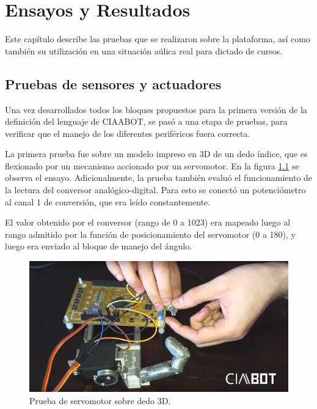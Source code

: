 
\chapter{Ensayos y Resultados} %

\label{Chapter4} %


Este capítulo describe las pruebas que se realizaron sobre la plataforma, así como también su utilización en una situación aúlica real para dictado de cursos.

\section{Pruebas de sensores y actuadores}
\label{sec:pruebas}
Una vez desarrollados todos los bloques propuestos para la primera versión de la definición del lenguaje de CIAABOT, se pasó a una etapa de pruebas, para verificar que el manejo de los diferentes periféricos fuera correcta.

La primera prueba fue sobre un modelo impreso en 3D de un dedo índice, que es flexionado por un mecanismo accionado por un servomotor. En la figura \ref{fig:dedoServo} se observa el ensayo. Adicionalmente, la prueba también evaluó el funcionamiento de la lectura del conversor analógico-digital. Para esto se conectó un potenciómetro al canal 1 de conversión, que era leído constantemente.

El valor obtenido por el conversor (rango de 0 a 1023) era mapeado luego al rango admitido por la función de posicionamiento del servomotor (0 a 180), y luego era enviado al bloque de manejo del ángulo.

\begin{figure}[h]
\centering
\includegraphics[scale=.3]{./Figures/dedo-servo.jpg}
\caption{Prueba de servomotor sobre dedo 3D.}
\label{fig:dedoServo}
\end{figure}


